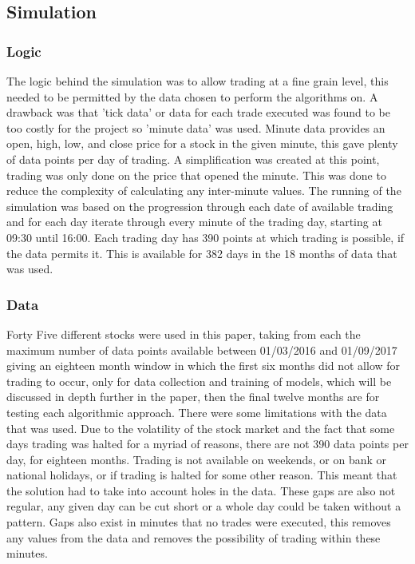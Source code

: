 \documentclass[12pt,a4paper]{article}
\begin{document}
\iffalse
This section presents the solutions to the problems in detail.  The design and implementation details should all be placed in this section.  You may create a number of subsections, each focussing on one issue.
This section should be between 4 to 7 pages in length.
\fi

\iffalse
#################################################################################
\fi

\subsection*{Simulation}

\subsubsection*{Logic}

The logic behind the simulation was to allow trading at a fine grain level, this needed to be permitted by the data chosen to perform the algorithms on. A drawback was that 'tick data' or data for each trade executed was found to be too costly for the project so 'minute data' was used. Minute data provides an open, high, low, and close price for a stock in the given minute, this gave plenty of data points per day of trading. A simplification was created at this point, trading was only done on the price that opened the minute. This was done to reduce the complexity of calculating any inter-minute values. The running of the simulation was based on the progression through each date of available trading and for each day iterate through every minute of the trading day, starting at 09:30 until 16:00. Each trading day has 390 points at which trading is possible, if the data permits it. This is available for 382 days in the 18 months of data that was used. 

\subsubsection*{Data}

Forty Five different stocks were used in this paper, taking from each the maximum number of data points available between 01/03/2016 and 01/09/2017 giving an eighteen month window in which the first six months did not allow for trading to occur, only for data collection and training of models, which will be discussed in depth further in the paper, then the final twelve months are for testing each algorithmic approach. There were some limitations with the data that was used. Due to the volatility of the stock market and the fact that some days trading was halted for a myriad of reasons, there are not 390 data points per day, for eighteen months. Trading is not available on weekends, or on bank or national holidays, or if trading is halted for some other reason. This meant that the solution had to take into account holes in the data. These gaps are also not regular, any given day can be cut short or a whole day could be taken without a pattern. Gaps also exist in minutes that no trades were executed, this removes any values from the data and removes the possibility of trading within these minutes.\\
\end{document}
